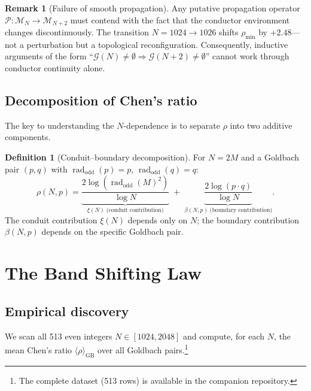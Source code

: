 \documentclass[11pt,a4paper]{article}
\theoremstyle{definition}
\newtheorem{definition}[theorem]{Definition}
\newtheorem{remark}[theorem]{Remark}
\DeclareMathOperator{\rad}{rad}
\begin{document}
\begin{remark}[Failure of smooth propagation]\label{rem:failure}
  Any putative propagation operator $\mathcal{P}: \mathcal{M}_N \to \mathcal{M}_{N+2}$
  must contend with the fact that the conductor environment changes discontinuously.
  The transition $N = 1024 \to 1026$ shifts $\rho_{\min}$ by $+2.48$---not a perturbation
  but a topological reconfiguration.  Consequently, inductive arguments of the form
  ``$\mathscr{G}(N) \neq \emptyset \Rightarrow \mathscr{G}(N+2) \neq \emptyset$''
  cannot work through conductor continuity alone.
\end{remark}


\subsection{Decomposition of Chen's ratio}

The key to understanding the $N$-dependence is to separate $\rho$ into two additive
components.

\begin{definition}[Conduit--boundary decomposition]\label{def:decomp}
  For $N = 2M$ and a Goldbach pair $(p, q)$ with $\rad_{\mathrm{odd}}(p) = p$,
  $\rad_{\mathrm{odd}}(q) = q$:
  \begin{equation}\label{eq:decomp}
    \rho(N, p) = \underbrace{\frac{2\log(\rad_{\mathrm{odd}}(M)^2)}{\log N}}_{\displaystyle
      \xi(N) \;\text{(conduit contribution)}}
    \;+\; \underbrace{\frac{2\log(p \cdot q)}{\log N}}_{\displaystyle
      \beta(N,p) \;\text{(boundary contribution)}}.
  \end{equation}
  The conduit contribution $\xi(N)$ depends only on $N$; the boundary contribution
  $\beta(N,p)$ depends on the specific Goldbach pair.
\end{definition}


\section{The Band Shifting Law}\label{sec:shifting}

\subsection{Empirical discovery}

We scan all 513 even integers $N \in [1024, 2048]$ and compute, for each $N$,
the mean Chen's ratio $\langle\rho\rangle_{\mathrm{GB}}$ over all Goldbach
pairs.\footnote{The complete dataset (513 rows) is available in the companion
repository.}
\end{document}
